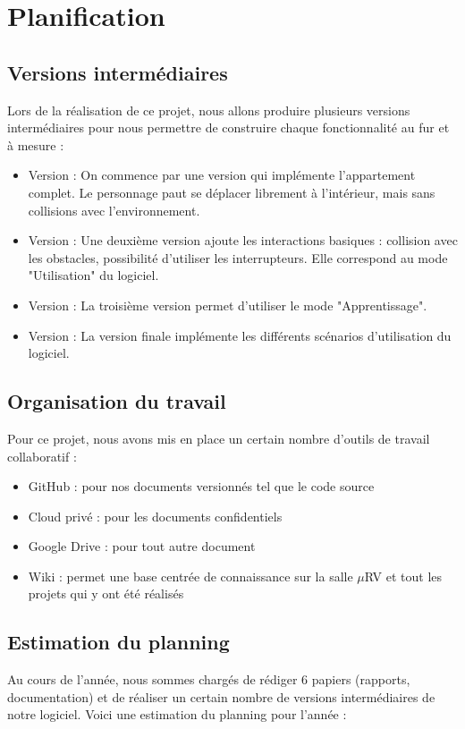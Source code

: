 \section{Planification}
\subsection{Versions intermédiaires}
Lors de la réalisation de ce projet, nous allons produire plusieurs versions intermédiaires pour nous permettre de construire chaque fonctionnalité au fur et à mesure :
\begin{itemize}
  \item Version  : On commence par une version qui implémente l'appartement complet. Le personnage paut se déplacer librement à l'intérieur, mais sans collisions avec l'environnement.
  \item Version  : Une deuxième version ajoute les interactions basiques : collision avec les obstacles, possibilité d'utiliser les interrupteurs. Elle correspond au mode "Utilisation" du logiciel.
  \item Version  : La troisième version permet d'utiliser le mode "Apprentissage".
  \item Version  : La version finale implémente les différents scénarios d'utilisation du logiciel.
\end{itemize}

\subsection{Organisation du travail}
Pour ce projet, nous avons mis en place un certain nombre d'outils de travail collaboratif :

\begin{itemize}
  \item GitHub : pour nos documents versionnés tel que le code source
  \item Cloud privé : pour les documents confidentiels
  \item Google Drive : pour tout autre document
  \item Wiki : permet une base centrée de connaissance sur la salle $\mu$RV et tout les projets qui y ont été réalisés
\end{itemize}


\subsection{Estimation du planning}
Au cours de l'année, nous sommes chargés de rédiger 6 papiers (rapports, documentation) et de réaliser un certain nombre de versions intermédiaires de notre logiciel.
Voici une estimation du planning pour l'année :

